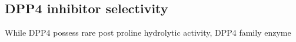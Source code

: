 \subsection{DPP4 inhibitor selectivity}
While DPP4 possess rare post proline hydrolytic activity, DPP4 family enzyme
